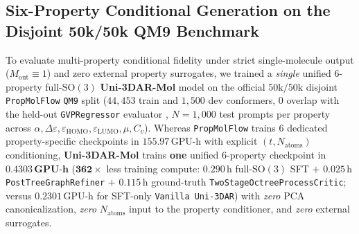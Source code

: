 \documentclass[11pt,a4paper]{article}
\begin{document}
\subsection{Six-Property Conditional Generation on the Disjoint 50k/50k QM9 Benchmark}
\label{sec:exp_qm9}

To evaluate multi-property conditional fidelity under strict single-molecule output ($M_{\text{out}} \equiv 1$) and zero external property surrogates, we trained a \emph{single} unified $6$-property full-$\text{SO}(3)$ \textbf{Uni-3DAR-Mol} model on the official $50\text{k}/50\text{k}$ disjoint \texttt{PropMolFlow} \texttt{QM9} split \citep{ramakrishnan2014qm9,zeng2026propmolflow} ($44{,}453$ train and $1{,}500$ dev conformers, $0$ overlap with the held-out \texttt{GVPRegressor} evaluator \citep{jing2021gvp}, $N=1{,}000$ test prompts per property across $\alpha, \Delta\varepsilon, \varepsilon_{\text{HOMO}}, \varepsilon_{\text{LUMO}}, \mu, C_v$). Whereas \texttt{PropMolFlow} trains $6$ dedicated property-specific checkpoints in $155.97\,\text{GPU-h}$ with explicit $(t, N_{\text{atoms}})$ conditioning, \textbf{Uni-3DAR-Mol} trains \textbf{one} unified $6$-property checkpoint in $\mathbf{0.4303\,\text{GPU-h}}$ ($\mathbf{362\times}$ less training compute: $0.290\,\text{h}$ full-$\text{SO}(3)$ SFT $+$ $0.025\,\text{h}$ \texttt{PostTree\allowbreak Graph\allowbreak Refiner} $+$ $0.115\,\text{h}$ ground-truth \texttt{TwoStage\allowbreak Octree\allowbreak ProcessCritic}; versus $0.2301\,\text{GPU-h}$ for SFT-only \texttt{Vanilla Uni-3DAR}) with \emph{zero} PCA canonicalization, \emph{zero} $N_{\text{atoms}}$ input to the property conditioner, and \emph{zero} external surrogates.
\end{document}
